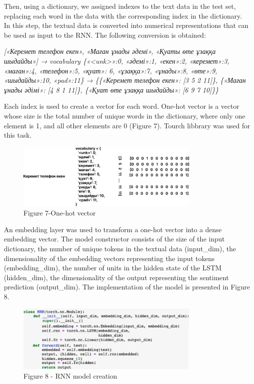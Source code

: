 Then, using a dictionary, we assigned indexes to the text data in the
test set, replacing each word in the data with the corresponding index
in the dictionary. In this step, the textual data is converted into
numerical representations that can be used as input to the RNN. The
following conversion is obtained:

\emph{{[}«Керемет телефон екен», «Маған ұнады әдемі», «Қуаты өте ұзаққа
шыдайды»{]} → vocabulary \{«\textless unk\textgreater»:0, «әдемі»:1,
«екен»:2, «керемет»:3, «маған»:4, «телефон»:5, «қуат»: 6, «ұзаққа»:7,
«ұнады»:8, «өте»:9, «шыдайды»:10, «pad»:11\} → \{\{«Керемет телефон
екен»: {[}3 5 2 11{]}\}, \{«Маған ұнады әдімі»: {[}4 8 1 11{]}\},
\{«Қуат өте ұзаққа шыдайды»: {[}6 9 7 10{]}\}\}}

Each index is used to create a vector for each word. One-hot vector is a
vector whose size is the total number of unique words in the dictionary,
where only one element is 1, and all other elements are 0 (Figure 7).
Tourch libbrary was used for this task.

\begin{figure}[H]
	\centering
	\includegraphics[width=0.8\textwidth]{media/ict/image14}
	\caption*{Figure 7-One-hot vector}
\end{figure}

An embedding layer was used to transform a one-hot vector into a dense
embedding vector. The model constructor consists of the size of the
input dictionary, the number of unique tokens in the textual data
(input\_dim), the dimensionality of the embedding vectors representing
the input tokens (embedding\_dim), the number of units in the hidden
state of the LSTM (hidden\_dim), the dimensionality of the output
representing the sentiment prediction (output\_dim). The implementation
of the model is presented in Figure 8.

\begin{figure}[H]
	\centering
	\includegraphics[width=0.8\textwidth]{media/ict/image15}
	\caption*{Figure 8 - RNN model creation}
\end{figure}

